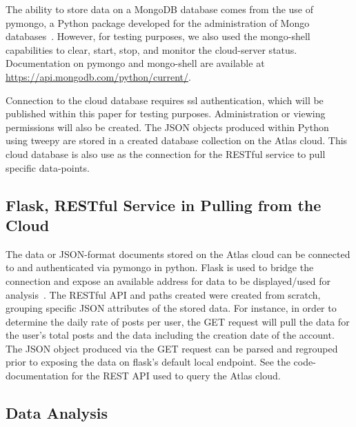 The ability to store data on a MongoDB database comes from the use of pymongo,
a Python package developed for the administration of Mongo
databases~\cite{PyMongoPython}. However, for testing purposes, we also used the
mongo-shell capabilities to clear, start, stop, and monitor the cloud-server
status. Documentation on pymongo and mongo-shell are available at
\url{https://api.mongodb.com/python/current/}.

Connection to the cloud database requires ssl authentication, which will be
published within this paper for testing purposes. Administration or viewing
permissions will also be created. The JSON objects produced within Python using
tweepy are stored in a created database collection on the Atlas cloud. This
cloud database is also use as the connection for the RESTful service to pull
specific data-points.

\subsection{Flask, RESTful Service in Pulling from the Cloud}

The data or JSON-format documents stored on the Atlas cloud can be connected to
and authenticated via pymongo in python. Flask is used to bridge the connection
and expose an available address for data to be displayed/used for
analysis~\cite{FlaskREST}. The RESTful API and paths created were created from
scratch, grouping specific JSON attributes of the stored data. For instance, in
order to determine the daily rate of posts per user, the GET request will pull
the data for the user's total posts and the data including the creation date of
the account. The JSON object produced via the GET request can be parsed and
regrouped prior to exposing the data on flask's default local endpoint. See the
code-documentation for the REST API used to query the Atlas cloud.

\subsection{Data Analysis}

